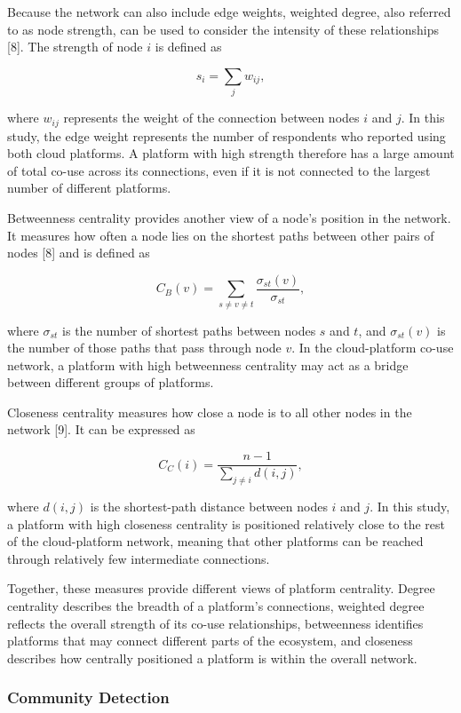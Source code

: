 \documentclass{article}
\begin{document}
\begin{itemize}
{{{Because the network can also include edge weights, weighted degree, also referred to as node strength, can be used to consider the intensity of these relationships [8]. The strength of node $i$ is defined as

\[
s_i = \sum_j w_{ij},
\]

where $w_{ij}$ represents the weight of the connection between nodes $i$ and $j$. In this study, the edge weight represents the number of respondents who reported using both cloud platforms. A platform with high strength therefore has a large amount of total co-use across its connections, even if it is not connected to the largest number of different platforms.

Betweenness centrality provides another view of a node's position in the network. It measures how often a node lies on the shortest paths between other pairs of nodes [8] and is defined as

\[
C_B(v) =
\sum_{s \neq v \neq t}
\frac{\sigma_{st}(v)}{\sigma_{st}},
\]

where $\sigma_{st}$ is the number of shortest paths between nodes $s$ and $t$, and $\sigma_{st}(v)$ is the number of those paths that pass through node $v$. In the cloud-platform co-use network, a platform with high betweenness centrality may act as a bridge between different groups of platforms.

Closeness centrality measures how close a node is to all other nodes in the network [9]. It can be expressed as

\[
C_C(i) =
\frac{n-1}{\sum_{j \neq i} d(i,j)},
\]

where $d(i,j)$ is the shortest-path distance between nodes $i$ and $j$. In this study, a platform with high closeness centrality is positioned relatively close to the rest of the cloud-platform network, meaning that other platforms can be reached through relatively few intermediate connections.

Together, these measures provide different views of platform centrality. Degree centrality describes the breadth of a platform's connections, weighted degree reflects the overall strength of its co-use relationships, betweenness identifies platforms that may connect different parts of the ecosystem, and closeness describes how centrally positioned a platform is within the overall network.
\subsubsection{Community Detection}

}}}
\end{itemize}
\end{document}
